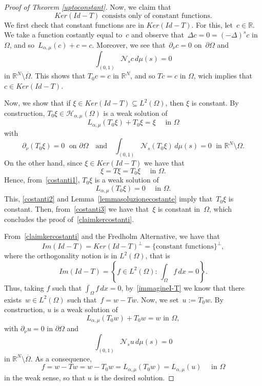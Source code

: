 \documentclass[12pt,a4paper,intlimits,sumlimits]{amsart}
\def \R {\mathbb{R}}
\def \Ns {\mathscr{N}_{s}}
\theoremstyle{definition}
\theoremstyle{plain}
\numberwithin{equation}{section}
\begin{document}
\begin{appendix}
\begin{proof}[Proof of Theorem \ref{uptoconstant}]
Now, we claim that
\begin{equation}\label{claimkercostanti}
Ker(Id-T) \mbox{ consists only of constant functions}.
\end{equation}
We first check that constant functions are in $Ker(Id-T)$. For this, let~$c\in\R$. We take a function costantly equal to~$c$ and observe that~$\Delta c=0=(-\Delta)^s c$ in~$\Omega$, and so~$L_{\alpha,\mu}(c)+c=c$. Moreover, we see that~$\partial_\nu c=0$ on~$\partial \Omega$ and 
\[
\int_{(0, 1)}\Ns c\,d\mu(s)=0
\]
in $\R^N\setminus \overline\Omega$. This shows that $T_0 c=c$ in $\R^N$,
and so $T c=c$ in $\Omega$, wich implies that $c\in Ker(Id-T)$.

Now, we show that if $\xi\in Ker(Id-T)\subseteq L^2(\Omega)$,
then $\xi$ is constant. By construction, 
$T_0 \xi\in \mathcal{H}_{\alpha,\mu}(\Omega)$ is a weak solution
of 
\begin{equation}\label{costanti1}
L_{\alpha,\mu}(T_0 \xi)+T_0 \xi =\xi\quad \mbox{ in }\Omega
\end{equation}
with
\begin{equation}\label{costanti2}
\partial_\nu (T_0 \xi)=0 \;\mbox{ on }\partial \Omega
\quad \mbox{and} \quad
\int_{(0, 1)}\Ns (T_0 \xi)\,d\mu(s)=0\; \mbox{ in }
\R^N\setminus \Omega.
\end{equation}
On the other hand, since $\xi \in Ker(Id-T)$ we have that
\begin{equation}\label{costanti3}
\xi =T\xi =T_0 \xi\quad \mbox{ in }\Omega.
\end{equation}
Hence, from~\eqref{costanti1}, $T_0 \xi$ is a weak solution of
\[
L_{\alpha,\mu}(T_0 \xi)=0 \quad\mbox{ in }\Omega.
\]
This, \eqref{costanti2} and Lemma~\ref{lemmasoluzionecostante}
imply that~$T_0 \xi$ is constant. Then, from~\eqref{costanti3} 
we have that~$\xi$ is constant in~$\Omega$, which concludes the 
proof of~\eqref{claimkercostanti}.

{F}rom~\eqref{claimkercostanti} and the Fredholm Alternative,
we have that
\[
Im(Id-T)=Ker(Id-T)^\perp=\{\mbox{constant functions}\}^\perp,
\]
where the orthogonality notion is in $L^2(\Omega)$, that is
\begin{equation}\label{immagineI-T}
Im(Id-T)=\left\{f\in L^2(\Omega):\,
\int_\Omega f\,dx =0 \right\}.
\end{equation}
Thus, taking $f$ such that $\int_\Omega f\,dx=0$, by~\eqref{immagineI-T} we know that there exists~$w\in L^2(\Omega)$
such that~$f=w-Tw$. Now, we set~$u:=T_0 w$. By construction,
$u$ is a weak solution of
\[
L_{\alpha,\mu}(T_0 w)+T_0 w= w \mbox{ in } \Omega,
\]
with $\partial_\nu u=0$ in 
$\partial \Omega$ and 
\[
\int_{(0, 1)}\Ns u\,d\mu(s)=0
\]
in $\R^N\setminus \overline\Omega$. As a consequence, 
\[
f=w-Tw=w-T_0 w= L_{\alpha,\mu}(T_0 w)=L_{\alpha,\mu}(u)\quad\mbox{ in } \Omega
\]
in the weak sense, so that $u$ is the desired solution.


\end{proof}
\end{appendix}
\end{document}
